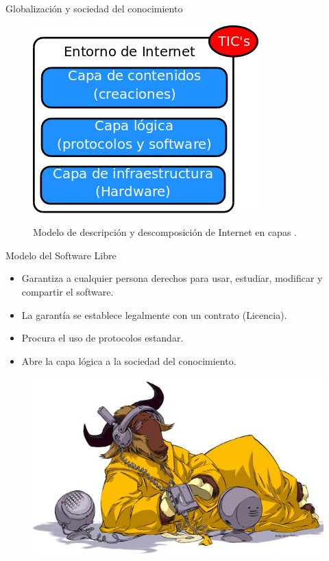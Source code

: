 \documentclass{beamer}
\begin{document}
\begin{frame}{Globalización y sociedad del conocimiento}
  \begin{figure}
    \includegraphics[scale=0.3]{img/internet}
    \label{fig:internet}
    \caption{Modelo de descripción y descomposición de Internet en capas \cite{Bercelli}.}
  \end{figure}
\end{frame}

\begin{frame}{Modelo del Software Libre}
  \begin{itemize}
  \item Garantiza a cualquier persona derechos para usar, estudiar, modificar y compartir el software.
  \item La garantía se establece legalmente con un contrato (Licencia).
  \item Procura el uso de protocolos estandar.
  \item Abre la capa lógica a la sociedad del conocimiento.
  \end{itemize}
  \begin{figure}
    \includegraphics{img/listen-eighth}
  \end{figure}
\end{frame}
\end{document}
